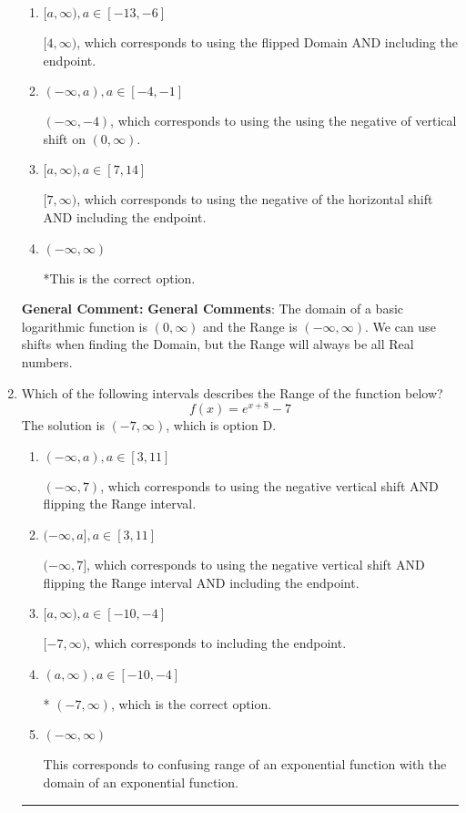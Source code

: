 \documentclass{extbook}[14pt]
\newcommand{\litem}[1]{\item #1

\rule{\textwidth}{0.4pt}}
\begin{document}
\begin{enumerate}
{\begin{enumerate}[label=\Alph*.]
$(-\infty, 4)$, which corresponds to using the vertical shift while the Range is $(-\infty, \infty)$.
\item \( [a, \infty), a \in [-13, -6] \)

$[4, \infty)$, which corresponds to using the flipped Domain AND including the endpoint.
\item \( (-\infty, a), a \in [-4, -1] \)

$(-\infty, -4)$, which corresponds to using the using the negative of vertical shift on $(0, \infty)$.
\item \( [a, \infty), a \in [7, 14] \)

$[7, \infty)$, which corresponds to using the negative of the horizontal shift AND including the endpoint.
\item \( (-\infty, \infty) \)

*This is the correct option.
\end{enumerate}

\textbf{General Comment:} \textbf{General Comments}: The domain of a basic logarithmic function is $(0, \infty)$ and the Range is $(-\infty, \infty)$. We can use shifts when finding the Domain, but the Range will always be all Real numbers.
}
\litem{
Which of the following intervals describes the Range of the function below?
\[ f(x) = e^{x+8}-7 \]The solution is \( (-7, \infty) \), which is option D.\begin{enumerate}[label=\Alph*.]
\item \( (-\infty, a), a \in [3, 11] \)

$(-\infty, 7)$, which corresponds to using the negative vertical shift AND flipping the Range interval.
\item \( (-\infty, a], a \in [3, 11] \)

$(-\infty, 7]$, which corresponds to using the negative vertical shift AND flipping the Range interval AND including the endpoint.
\item \( [a, \infty), a \in [-10, -4] \)

$[-7, \infty)$, which corresponds to including the endpoint.
\item \( (a, \infty), a \in [-10, -4] \)

* $(-7, \infty)$, which is the correct option.
\item \( (-\infty, \infty) \)

This corresponds to confusing range of an exponential function with the domain of an exponential function.
\end{enumerate}

}
\end{enumerate}
\end{document}
